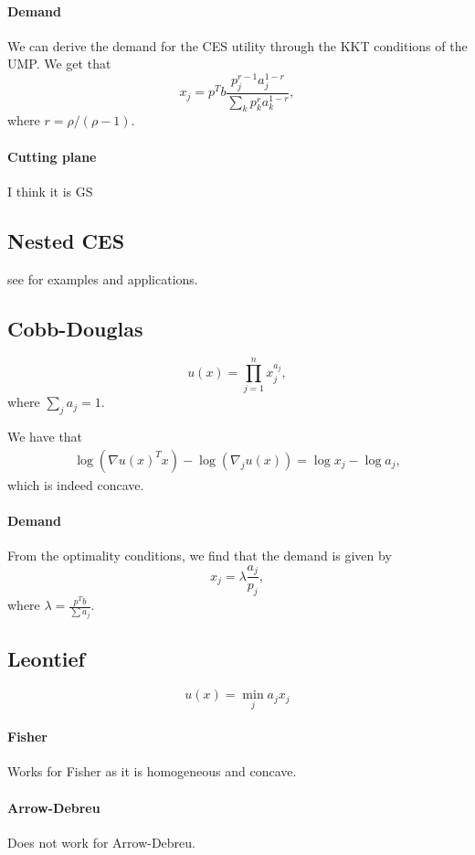 \documentclass{article}
\begin{document}
\paragraph{Demand}
We can derive the demand for the CES utility through the KKT conditions of the
UMP. We get that
\[
x_j = p^Tb\frac{p_j^{r-1} a_j^{1-r}}{\sum_k p_k^r a_k^{1-r}},
\]
where $r = \rho/(\rho-1)$.

\paragraph{Cutting plane} I think it is GS

\subsection{Nested CES}
see \cite{shoven1992applying} for examples and applications.  

\subsection{Cobb-Douglas}
\[
u(x) = \prod_{j=1}^{n} x_j^{a_j},
\]
where $\sum_j a_j = 1$.

We have that
\begin{align*}
\log(\nabla u(x)^T x) - \log(\nabla_j u(x)) =
\log x_j - \log a_j,
\end{align*}
which is indeed concave.

\paragraph{Demand}
From the optimality conditions, we find that the demand is given by
\[
x_j = \lambda \frac{a_j}{p_j},
\]
where $\lambda = \frac{p^Tb}{\sum a_j}$.

\subsection{Leontief}
\[
u(x) = \min_j a_j x_j
\]

\paragraph{Fisher}
Works for Fisher as it is homogeneous and concave.

\paragraph{Arrow-Debreu}
Does not work for Arrow-Debreu.
\end{document}
